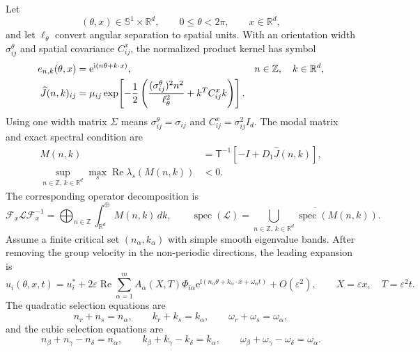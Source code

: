 \documentclass[11pt]{article}
\newcommand{\ii}{\mathrm{i}}
\newcommand{\ee}{\mathrm{e}}
\newcommand{\RePart}{\operatorname{Re}}
\newcommand{\T}{\mathsf T}
\begin{document}
Let
\begin{equation}
 (\theta,x)\in\mathbb S^1\times\mathbb R^d,\qquad
 0\leq\theta<2\pi,\qquad x\in\mathbb R^d,
\end{equation}
and let $\ell_\theta$ convert angular separation to spatial units.  With an
orientation width $\sigma_{ij}^\theta$ and spatial covariance $C_{ij}^x$,
the normalized product kernel has symbol
\begin{align}
 e_{n,k}(\theta,x)&=\ee^{\ii(n\theta+k\cdot x)},
 &n&\in\mathbb Z,\quad k\in\mathbb R^d,\notag\\
 \widehat J(n,k)_{ij}
 &=\mu_{ij}\exp\!\left[-\frac12\left(
 \frac{(\sigma_{ij}^\theta)^2n^2}{\ell_\theta^2}
 +k^TC_{ij}^xk\right)\right].
 \label{eq:mixed-symbol}
\end{align}
Using one width matrix $\Sigma$ means
$\sigma_{ij}^\theta=\sigma_{ij}$ and
$C_{ij}^x=\sigma_{ij}^2I_d$.  The modal matrix and exact spectral condition
are
\begin{align}
 M(n,k)&=\T^{-1}\left[-I+D_1\widehat J(n,k)\right],
 \label{eq:mixed-M}\\
 \sup_{n\in\mathbb Z,\,k\in\mathbb R^d}
 \max_s\RePart\lambda_s(M(n,k))&<0.
 \label{eq:mixed-stability}
\end{align}
The corresponding operator decomposition is
\begin{equation}
 \mathcal F_x\mathcal L\mathcal F_x^{-1}
 =\bigoplus_{n\in\mathbb Z}
 \int_{\mathbb R^d}^{\oplus}M(n,k)\,dk,
 \qquad
 \operatorname{spec}(\mathcal L)
 =\overline{\bigcup_{n\in\mathbb Z,\,k\in\mathbb R^d}
 \operatorname{spec}(M(n,k))}.
 \label{eq:mixed-direct-integral}
\end{equation}
Assume a finite critical set $(n_\alpha,k_\alpha)$ with simple smooth
eigenvalue bands.  After removing the group velocity in the non-periodic
directions, the leading expansion is
\begin{equation}
 u_i(\theta,x,t)=u_i^*+2\varepsilon\RePart\sum_{\alpha=1}^m
 A_\alpha(X,T)\Phi_{i\alpha}
 \ee^{\ii(n_\alpha\theta+k_\alpha\cdot x+\omega_\alpha t)}
 +O(\varepsilon^2),
 \qquad X=\varepsilon x,\quad T=\varepsilon^2t.
 \label{eq:mixed-superposition}
\end{equation}
The quadratic selection equations are
\begin{equation}
 n_r+n_s=n_\alpha,\qquad
 k_r+k_s=k_\alpha,\qquad
 \omega_r+\omega_s=\omega_\alpha,
 \label{eq:mixed-quadratic-resonance}
\end{equation}
and the cubic selection equations are
\begin{equation}
 n_\beta+n_\gamma-n_\delta=n_\alpha,\qquad
 k_\beta+k_\gamma-k_\delta=k_\alpha,\qquad
 \omega_\beta+\omega_\gamma-\omega_\delta=\omega_\alpha.
 \label{eq:mixed-resonance}
\end{equation}
\end{document}
